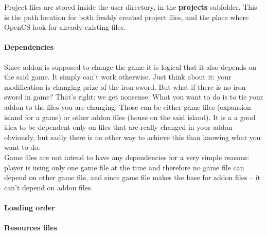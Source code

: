 Project files are stored inside the user directory, in the \textbf{projects} subfolder. This is the path location for both freshly created project files, and the place where Open{CS} look for already existing files.

\paragraph{Dependencies}
Since addon is supposed to change the game it is logical that it also depends on the said game. It simply can't work otherwise. Just think about it: your modification is changing prize of the iron sword. But what if there is no iron sword in game? That's right: we get nonsense. What you want to do is to tie your addon to the files you are changing. Those can be either game files (expansion island for a game) or other addon files (house on the said island). It is a a good idea to be dependent only on files that are really changed in your addon obviously, but sadly there is no other way to achieve this than knowing what you want to do.\\

Game files are not intend to have any dependencies for a very simple reasons: player is using only one game file at the time and therefore no game file can depend on other game file, and since game file makes the base for addon files -- it can't depend on addon files.

\paragraph{Loading order}

\paragraph{Resources files}
